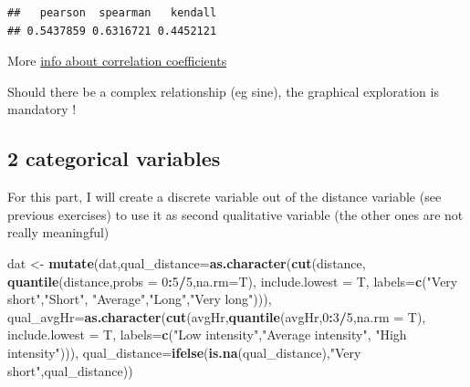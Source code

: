 \documentclass[
]{book}
\newenvironment{Shaded}{\begin{snugshade}}{\end{snugshade}}
\newcommand{\DataTypeTok}[1]{\textcolor[rgb]{0.13,0.29,0.53}{#1}}
\newcommand{\DecValTok}[1]{\textcolor[rgb]{0.00,0.00,0.81}{#1}}
\newcommand{\KeywordTok}[1]{\textcolor[rgb]{0.13,0.29,0.53}{\textbf{#1}}}
\newcommand{\NormalTok}[1]{#1}
\newcommand{\OperatorTok}[1]{\textcolor[rgb]{0.81,0.36,0.00}{\textbf{#1}}}
\newcommand{\StringTok}[1]{\textcolor[rgb]{0.31,0.60,0.02}{#1}}
\begin{document}
\begin{verbatim}
##   pearson  spearman   kendall 
## 0.5437859 0.6316721 0.4452121
\end{verbatim}

More \href{https://www.statisticssolutions.com/correlation-pearson-kendall-spearman/}{info about correlation coefficients}

Should there be a complex relationship (eg sine), the graphical exploration is mandatory !

\hypertarget{categorical-variables-1}{%
\subsection{2 categorical variables}\label{categorical-variables-1}}

For this part, I will create a discrete variable out of the distance variable (see previous exercises) to use it as second qualitative variable (the other ones are not really meaningful)

\begin{Shaded}
\begin{Highlighting}[]
\NormalTok{dat <-}\StringTok{ }\KeywordTok{mutate}\NormalTok{(dat,}\DataTypeTok{qual_distance=}\KeywordTok{as.character}\NormalTok{(}\KeywordTok{cut}\NormalTok{(distance,}
                                                 \KeywordTok{quantile}\NormalTok{(distance,}\DataTypeTok{probs =} \DecValTok{0}\OperatorTok{:}\DecValTok{5}\OperatorTok{/}\DecValTok{5}\NormalTok{,}\DataTypeTok{na.rm=}\NormalTok{T),}
                                                 \DataTypeTok{include.lowest =}\NormalTok{ T,}
                                                 \DataTypeTok{labels=}\KeywordTok{c}\NormalTok{(}\StringTok{"Very short"}\NormalTok{,}\StringTok{"Short"}\NormalTok{,}
                                                          \StringTok{"Average"}\NormalTok{,}\StringTok{"Long"}\NormalTok{,}\StringTok{"Very long"}\NormalTok{))),}
              \DataTypeTok{qual_avgHr=}\KeywordTok{as.character}\NormalTok{(}\KeywordTok{cut}\NormalTok{(avgHr,}\KeywordTok{quantile}\NormalTok{(avgHr,}\DecValTok{0}\OperatorTok{:}\DecValTok{3}\OperatorTok{/}\DecValTok{5}\NormalTok{,}\DataTypeTok{na.rm =}\NormalTok{ T),}
                                          \DataTypeTok{include.lowest =}\NormalTok{ T,}
                                          \DataTypeTok{labels=}\KeywordTok{c}\NormalTok{(}\StringTok{"Low intensity"}\NormalTok{,}\StringTok{"Average intensity"}\NormalTok{,}
                                                   \StringTok{"High intensity"}\NormalTok{))),}
              \DataTypeTok{qual_distance=}\KeywordTok{ifelse}\NormalTok{(}\KeywordTok{is.na}\NormalTok{(qual_distance),}\StringTok{"Very short"}\NormalTok{,qual_distance))}
\end{Highlighting}
\end{Shaded}
\end{document}
